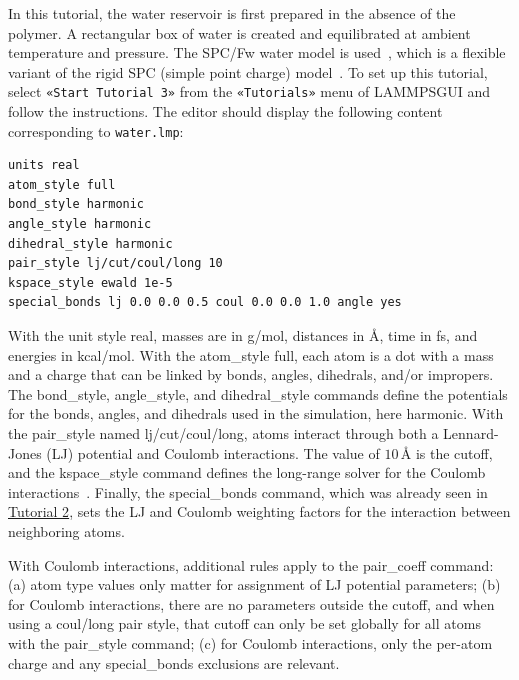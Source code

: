 \documentclass[9pt,tutorial]{livecoms}
\newcommand{\lmpcmd}[1]{\colorbox{listing}{\textcolor{command}{\small{#1}}}} %
\newcommand{\flecmd}[1]{\textcolor{command}{\texttt{#1}}} %
\newcommand{\guicmd}[1]{\textcolor{command}{\texttt{«#1»}}} %
\newcommand{\lammpsgui}{\textsf{LAMMPS\textendash GUI}}
\begin{document}
In this tutorial, the water reservoir is first prepared in the absence of the polymer.
A rectangular box of water is created and equilibrated at ambient temperature and
pressure.  The SPC/Fw water model is used~\cite{wu2006flexible}, which is
a flexible variant of the rigid SPC (simple point charge) model~\cite{berendsen1981interaction}.
To set up this tutorial, select \guicmd{Start Tutorial 3} from the
\guicmd{Tutorials} menu of \lammpsgui{} and follow the instructions.
The editor should display the following content corresponding to \flecmd{water.lmp}:
\begin{lstlisting}
units real
atom_style full
bond_style harmonic
angle_style harmonic
dihedral_style harmonic
pair_style lj/cut/coul/long 10
kspace_style ewald 1e-5
special_bonds lj 0.0 0.0 0.5 coul 0.0 0.0 1.0 angle yes
\end{lstlisting}
With the unit style \lmpcmd{real}, masses are in g/mol, distances in Å,
time in fs, and energies in kcal/mol.  With the \lmpcmd{atom\_style
  full}, each atom is a dot with a mass and a charge that can be linked
by bonds, angles, dihedrals, and/or impropers.  The
\lmpcmd{bond\_style}, \lmpcmd{angle\_style}, and
\lmpcmd{dihedral\_style} commands define the potentials for the bonds,
angles, and dihedrals used in the simulation, here \lmpcmd{harmonic}.
With the \lmpcmd{pair\_style} named \lmpcmd{lj/cut/coul/long}, atoms
interact through both a Lennard-Jones (LJ) potential and Coulomb
interactions.  The value of $10\,\text{\AA{}}$ is the cutoff, and the
\lmpcmd{kspace\_style} command defines the long-range solver for the Coulomb
interactions~\cite{ewald1921berechnung}.  Finally, the
\lmpcmd{special\_bonds} command, which was already seen in
\hyperref[carbon-nanotube-label]{Tutorial 2}, sets the LJ and Coulomb
weighting factors for the interaction between neighboring atoms.

\begin{note}
  With Coulomb interactions, additional rules
  apply to the \lmpcmd{pair\_coeff} command: (a) atom type values
  only matter for assignment of LJ potential parameters; (b) for Coulomb interactions,
  there are no parameters outside the cutoff, and when using a
  \lmpcmd{coul/long} pair style, that cutoff can only be set globally
  for all atoms with the \lmpcmd{pair\_style}  command;  (c) for
  Coulomb interactions, only the per-atom charge and any
  \lmpcmd{special\_bonds} exclusions are relevant.
\end{note}
\end{document}
